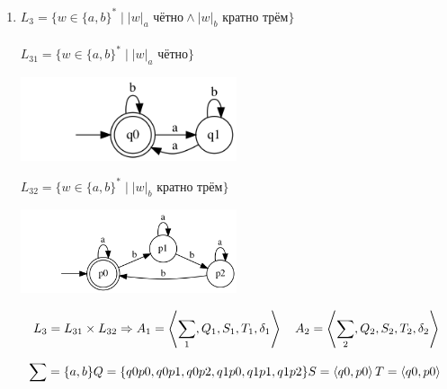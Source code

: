 \documentclass{article}
\begin{document}
\begin{enumerate}
\item {$L_3 = \{w \in \{a,b\}^*   \mid   |w|_a \text{ чётно} \wedge |w|_b \text{ кратно трём} \} $} \\ \\
    $L_{31} = \{w \in \{a,b\}^*   \mid   |w|_a \text{ чётно} \} $\\
    \begin{center}
        \includegraphics[width=0.5\textwidth]{g231.png}
    \end{center}
    $L_{32} = \{w \in \{a,b\}^*   \mid   |w|_b \text{ кратно трём} \} $\\
    \begin{center}
        \includegraphics[width=0.5\textwidth]{g232.png}
    \end{center}
    
    \begin{center}
    \[
        L_3 = L_{31} \times L_{32} \Rightarrow \\
        A_1 = \left\langle \sum_{1} , Q_1, S_1, T_1, \delta_1\right\rangle \quad 
        A_2 = \left\langle \sum_{2}, Q_2, S_2, T_2, \delta_2\right\rangle
    \]
    
    \[
        \sum = \{a, b\} \\
        Q = \{q0p0, q0p1, q0p2, q1p0, q1p1, q1p2\} \\
        S = \left\langle q0,p0 \right\rangle \\
        T = \left\langle q0,p0 \right\rangle \\
    \]
    

\end{center}
\end{enumerate}
\end{document}
